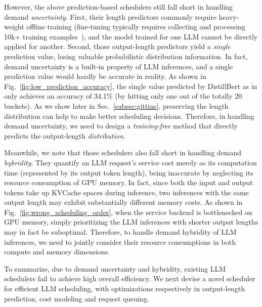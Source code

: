 However, the above prediction-based schedulers still fall short in handling demand \emph{uncertainty}.
First, their length predictors commonly require heavy-weight offline training (fine-tuning typically requires collecting and processing 10k+ training examples~\cite{jin2023s, fu2024efficient}), and the model trained for one LLM cannot be directly applied for another.
Second, those output-length predictors yield a \emph{single} prediction value, losing valuable probabilistic distribution information.
In fact, demand uncertainty is a built-in property of LLM inferences, and a single prediction value would hardly be accurate in reality. 
As shown in Fig.~\ref{fig:low_prediction_accuracy}, 
the single value predicted by DistillBert as in \cite{qiu2024efficient} only achieves an accuracy of 34.1\% (by hitting only one out of the totally {20} buckets).
As we show later in Sec.~\ref{subsec:gittins}, preserving the length distribution can help to make better scheduling decisions. 
Therefore, in handling demand uncertainty, we need to design a \emph{training-free} method that directly predicts the output-length \emph{distribution}.

Meanwhile, we note that those schedulers also fall short in handling demand \emph{hybridity}. 
They quantify an LLM request's service cost merely as its computation time (represented by its output token length), being inaccurate by neglecting its resource consumption of GPU memory. 
In fact, since both the input and output tokens take up KVCache spaces during inference, two inferences with the same output length may exhibit substantially different memory costs.  
As shown in Fig.~\ref{fig:wrong_scheduling_order},  when the service backend is bottlenecked on GPU memory, simply prioritizing the LLM inferences with shorter output lengths may in fact be suboptimal. %
Therefore, to handle demand hybridity of LLM inferences, we need to jointly consider their resource consumptions in both compute and memory dimensions.

To summarize, due to demand uncertainty and hybridity, existing LLM schedulers fail to achieve high overall efficiency. 
We next devise a novel scheduler for efficient LLM scheduling, with optimizations respectively in output-length prediction, cost modeling and request queuing. 